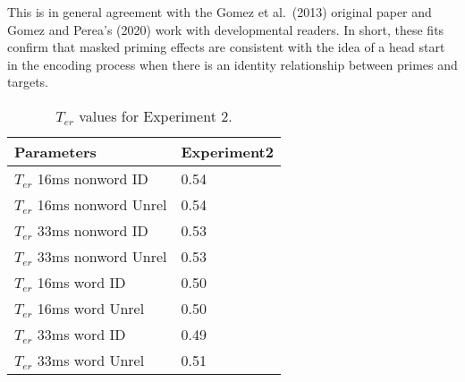 \documentclass[
  english,
  man,floatsintext]{apa6}
\begin{document}
\begin{appendix}
\begin{table}[tbp]
\begin{center}
\begin{threeparttable}
\end{threeparttable}
\end{center}

\end{table}

This is in general agreement with the Gomez et al.~(2013) original paper
and Gomez and Perea's (2020) work with developmental readers. In short,
these fits confirm that masked priming effects are consistent with the
idea of a head start in the encoding process when there is an identity
relationship between primes and targets.

\begin{table}[tbp]

\begin{center}
\begin{threeparttable}

\caption{\label{tab:appendix_table_3} $T_{er}$ values for Experiment 2.}

\begin{tabular}{ll}
\toprule
Parameters & \multicolumn{1}{c}{Experiment2}\\
\midrule
$T_{er}$ 16ms nonword ID & 0.54\\
$T_{er}$ 16ms nonword Unrel & 0.54\\
$T_{er}$ 33ms nonword ID & 0.53\\
$T_{er}$ 33ms nonword Unrel & 0.53\\
$T_{er}$ 16ms word ID & 0.50\\
$T_{er}$ 16ms word Unrel & 0.50\\
$T_{er}$ 33ms word ID & 0.49\\
$T_{er}$ 33ms word Unrel & 0.51\\
\bottomrule
\end{tabular}

\end{threeparttable}
\end{center}

\end{table}
\end{appendix}
\end{document}
